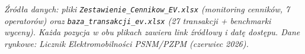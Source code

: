 \documentclass[11pt,a4paper]{article}
\begin{document}
	\vspace{0.5cm}
	\noindent\hrulefill
	
	\vspace{0.3cm}
	\small\textit{Źródła danych: pliki \texttt{Zestawienie\_Cennikow\_EV.xlsx}
		(monitoring cenników, 7 operatorów) oraz \texttt{baza\_transakcji\_ev.xlsx}
		(27 transakcji + benchmarki wyceny). Każda pozycja w obu plikach zawiera
		link źródłowy i datę dostępu. Dane rynkowe: Licznik Elektromobilności
		PSNM/PZPM (czerwiec 2026).}
	
\end{document}
